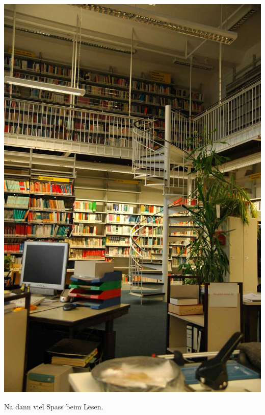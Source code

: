 \begin{center}
\includegraphics[width=0.7\linewidth]{bilder/bib.jpg}
\end{center}

Na dann viel Spass beim Lesen.
\spaltenende
